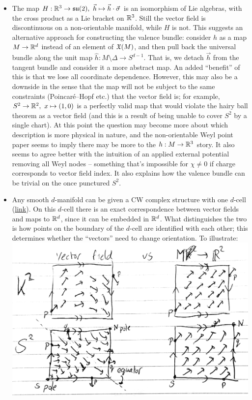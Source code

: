 {\begin{itemize}
	\item The map $H: \R^3\to\la[su](2),\ \vec{h}\mapsto \vec{h}\cdot\vec{\sigma}$ is an isomorphism of Lie algebras, with the cross product as a Lie bracket on $\mathbb{R}^3$. Still the vector field is discontinuous on a non-orientable manifold, while $H$ is not. This suggests an alternative approach for constructing the valence bundle: consider $h$ as a map $M\to\mathbb{R}^d$ instead of an element of $\mathfrak{X}(M)$, and then pull back the universal bundle along the unit map $\hat{h}:M\setminus\Delta\to S^{d-1}$. That is, we detach $\vec{h}$ from the tangent bundle and consider it a more abstract map. An added ``benefit'' of this is that we lose all coordinate dependence. However, this may also be a downside in the sense that the map will not be subject to the same constraints (Poincaré--Hopf etc.) that the vector field is; for example, $S^2\to\R^2,\ x\mapsto(1,0)$ is a perfectly valid map that would violate the hairy ball theorem as a vector field (and this is a result of being unable to cover $S^2$ by a single chart). At this point the question may become more about which description is more physical in nature, and the non-orientable Weyl point paper\cite{Fonseca-Vaidya_nonorientable} seems to imply there may be more to the $h:M\to\mathbb{R}^3$ story. It also seems to agree better with the intuition of an applied external potential removing all Weyl nodes -- something that's impossible for $\chi\neq0$ if charge corresponds to vector field index. It also explains how the valence bundle can be trivial on the once punctured $S^2$.
	
	\item Any smooth $d$-manifold can be given a CW complex structure with one $d$-cell (\href{https://mathoverflow.net/questions/120799/manifolds-admitting-cw-structure-with-single-n-cell}{link}). On this $d$-cell there is an exact correspondence between vector fields and maps to $\mathbb{R}^d$, since it can be embedded in $\mathbb{R}^d$. What distinguishes the two is how points on the boundary of the $d$-cell are identified with each other; this determines whether the ``vectors'' need to change orientation. To illustrate:\\
	\includegraphics[width=.9\textwidth]{Images/vectorfield-vs-map}
	

\end{itemize}}
